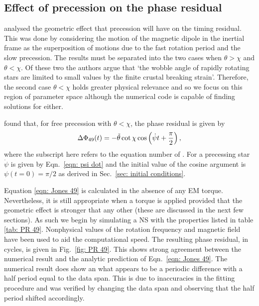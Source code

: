 \documentclass[../full_thesis/full_thesis.tex]{subfiles}
\begin{document}
\subsection{Effect of precession on the phase residual}

\citet{Jones2001} analysed the geometric effect that precession will have on
the timing residual. This was done by considering the motion of the magnetic
dipole in the inertial frame as the superposition of motions due to the fast
rotation period and the slow precession. The results must be separated into the
two cases when $\theta > \chi$ and $\theta < \chi$. Of these two the authors
argue that `the wobble angle  of rapidly rotating stars are limited to small
values by the finite crustal breaking strain'. Therefore, the second case
$\theta < \chi$ holds greater physical relevance and so we focus on this region
of parameter space although the numerical code is capable of finding solutions
for either.

\citet{Jones2001} found that, for free precession with $\theta < \chi$,
the phase residual is given by
\begin{equation}
    \Delta\Phi_{49}(t) = -\tilde{\theta} \cot\chi\cos\left(\dot{\psi}t + \frac{\pi}{2}\right),
    \label{eqn: Jones 49}
\end{equation}
where the subscript here refers to the equation number of \citet{Jones2001}.
For a precessing star $\dot{\psi}$ is given by Eqn.~\eqref{eqn: psi dot} and
the initial value of the cosine argument is $\psi(t=0)=\pi/2$ as derived in
Sec.~\ref{sec: initial conditions}.

Equation \eqref{eqn: Jones 49} is calculated in the absence of any EM torque.
Nevertheless, it is still appropriate when a torque is applied provided
that the geometric effect is stronger that any other (these are discussed in
the next few sections). As such we begin by simulating a NS with the properties
listed in table \ref{tab: PR 49}. Nonphysical values of the
rotation frequency and magnetic field have been used to aid the computational
speed. The resulting phase residual, in cycles, is given in Fig.~\ref{fig:
PR 49}.
This shows strong agreement between the numerical result and the analytic
prediction of Eqn.~\eqref{eqn: Jones 49}. The numerical result does show an
what appears to be a periodic difference with a half period equal to the
data span. This is due to inaccuracies in the fitting procedure and was verified
by changing the data span and observing that the half period shifted accordingly.
\end{document}
